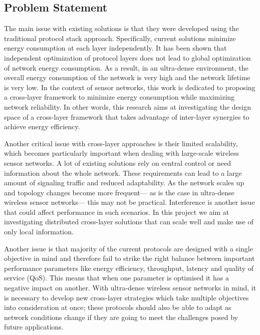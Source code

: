 \documentclass[a4paper,fleqn]{cas-dc}
\numberwithin{equation}{section}
\begin{document}
\subsection{Problem Statement}

The main issue with existing solutions is that they were developed using the traditional protocol stack approach. Specifically, current solutions minimize energy consumption at each layer independently. It has been shown that independent optimization of protocol layers does not lead to global optimization of network energy consumption. As a result, in an ultra-dense environment, the overall energy consumption of the network is very high and the network lifetime is very low. In the context of sensor networks, this work is dedicated to proposing a cross-layer framework to minimize energy consumption while maximizing network reliability. In other words, this research aims at investigating the design space of a cross-layer framework that takes advantage of inter-layer synergies to achieve energy efficiency.

Another critical issue with cross-layer approaches is their limited scalability, which becomes particularly important when dealing with large-scale wireless sensor networks. A lot of existing solutions rely on central control or need information about the whole network. These requirements can lead to a large amount of signaling traffic and reduced adaptability. As the network scales up and topology changes become more frequent— as is the case in ultra-dense wireless sensor networks— this may not be practical. Interference is another issue that could affect performance in such scenarios. In this project we aim at investigating distributed cross-layer solutions that can scale well and make use of only local information.

Another issue is that majority of the current protocols are designed with a single objective in mind and therefore fail to strike the right balance between important performance parameters like energy efficiency, throughput, latency and quality of service (QoS). This means that when one parameter is optimised it has a negative impact on another. With ultra-dense wireless sensor networks in mind, it is necessary to develop new cross-layer strategies which take multiple objectives into consideration at once; these protocols should also be able to adapt as network conditions change if they are going to meet the challenges posed by future applications.
\end{document}
